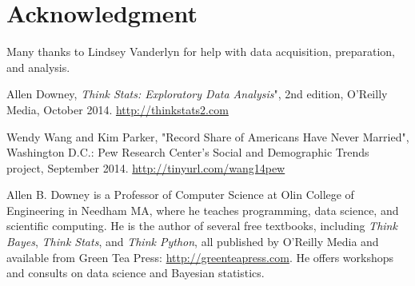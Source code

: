 \documentclass[journal]{IEEEtran}
\begin{document}
\section*{Acknowledgment}
Many thanks to Lindsey Vanderlyn for help with data acquisition,
preparation, and analysis.


\ifCLASSOPTIONcaptionsoff
  \newpage
\fi




\begin{thebibliography}{1}

Allen Downey, {\it Think Stats: Exploratory Data Analysis}", 2nd edition, 
            O'Reilly Media, October 2014.
            \url{http://thinkstats2.com}

Wendy Wang and Kim Parker, "Record Share of Americans 
           Have Never Married", Washington D.C.: Pew Research Center's
           Social and Demographic Trends project, September 2014.
           \url{http://tinyurl.com/wang14pew}
           

\end{thebibliography}



\begin{IEEEbiography}{Allen B. Downey}
is a Professor of Computer Science at Olin College of Engineering
in Needham MA, where he teaches programming, data science, and scientific computing.
He is the author of several free textbooks, including
{\it Think Bayes}, {\it Think Stats}, and {\it Think Python}, all published
by O'Reilly Media and available from Green Tea Press: \url{http://greenteapress.com}.  He offers workshops and consults on data
science and Bayesian statistics.
\end{IEEEbiography}
\end{document}
